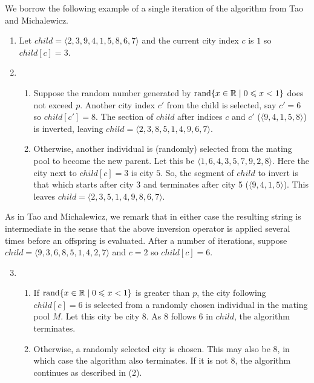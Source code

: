 We borrow the following example of a single iteration of the algorithm 
from Tao and Michalewicz.
\begin{enumerate}
	\item Let $child = \langle 2, 3, 9, 4, 1, 5, 8, 6, 7\rangle$ and the current
	city index $c$ is $1$ so $child[c] = 3$.
	\item \begin{enumerate}
		\item Suppose the random number generated by 
		 $\operatorname{rand}\{x \in \mathbb R \mid 0 \leqslant x < 1\}$
		 does not exceed $p$. Another city index $c'$ from the child is 
		 selected, say $c' = 6$ so $child[c'] = 8$. The section of $child$ 
		 after indices $c$ and $c'$ (\ie $\langle 9, 4, 1, 5, 8 \rangle$) is 
		 inverted, leaving $child = \langle 2, 3, 8, 5, 1, 4, 9, 6, 7 \rangle$.
		\item Otherwise, another individual is (randomly) selected from the
		mating pool to become the new parent. Let this be 
		$\langle 1, 6, 4, 3, 5, 7, 9, 2, 8 \rangle$. Here the city next to 
		$child[c] = 3$ is city $5$. So, the segment of $child$ to invert is 
		that which starts after city 3 and terminates after city 5 
		(\ie $\langle 9, 4, 1, 5 \rangle$). This 
		leaves $child = \langle 2, 3, 5, 1, 4, 9, 8, 6, 7\rangle$.
	\end{enumerate}
\end{enumerate}
As in Tao and Michalewicz, we remark that in either case the resulting 
string is intermediate in the sense that the above inversion operator is 
applied several times before an offspring is evaluated. After a number
of iterations, suppose $child = \langle 9, 3, 6, 8, 5, 1, 4, 2, 7\rangle$ 
and $c = 2$ so $child[c] = 6$.
\begin{enumerate}
	\setcounter{enumi}{2}
	\item \begin{enumerate}
		\item  If $\operatorname{rand}\{x \in \mathbb R \mid 0 \leqslant x < 1\}$ is greater
		than $p$, the city following $child[c] = 6$ is selected from a 
		randomly chosen individual in the mating pool $M$. Let this 
		city be city $8$. As $8$ follows $6$ in $child$, the algorithm 
		terminates.
		\item Otherwise, a randomly selected city is chosen. This may 
		also be $8$, in which case the algorithm also terminates. If it is 
		not $8$, the algorithm continues as described in (2).
	\end{enumerate}
\end{enumerate} 